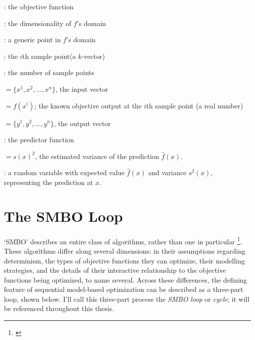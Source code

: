 \begin{minipage}{\textwidth}
\begin{framed}
\begin{description}[leftmargin=!,labelwidth=\widthof{\bfseries thre}]
  \item[$f$]: the objective function
  \item[$k$]: the dimensionality of $f$'s domain
  \item[$x$]: a generic point in $f$'s domain
  \item[$x^i$]: the $i$th sample point(a $k$-vector)
  \item[$n$]: the number of sample points
  \item[$\X$]$=\{x^1,x^2,...,x^n\}$, the input vector
  \item[$y^i$]$= f(x^i)$; the known objective output at the $i$th sample point (a real number)
  \item[$\Y$]$=\{y^1,y^2,...,y^n\}$, the output vector
  \item[$\hat{f}(x)$]: the predictor function
  \item[$s^2(x)$]$=s(x)^2$, the estimated variance of the prediction $\hat{f}(x)$.  
  \item[$y(x)$]: a random variable with expected value $\hat{f}(x)$ and variance $s^2(x)$, representing the prediction at $x$.
\end{description}


\end{framed}
\label{fig:notation}
\end{minipage}

\section{The SMBO Loop}

`SMBO' describes an entire class of algorithms, rather than one in particular \footnote{\cite{hutter_sequential_2011, hamadi_autonomous_2012, jones_efficient_1998, rasmussen_gaussian_2006}}. %
These algorithms differ along several dimensions: in their assumptions regarding determinism, the types of objective functions they can optimize, their modelling strategies, and the details of their interactive relationship to the objective functions being optimized, to name several. %
Across these differences, the defining feature of sequential model-based optimization can be described as a three-part loop, shown below. I'll call this three-part process the \emph{SMBO loop} or \emph{cycle}; it will be referenced throughout this thesis. 



